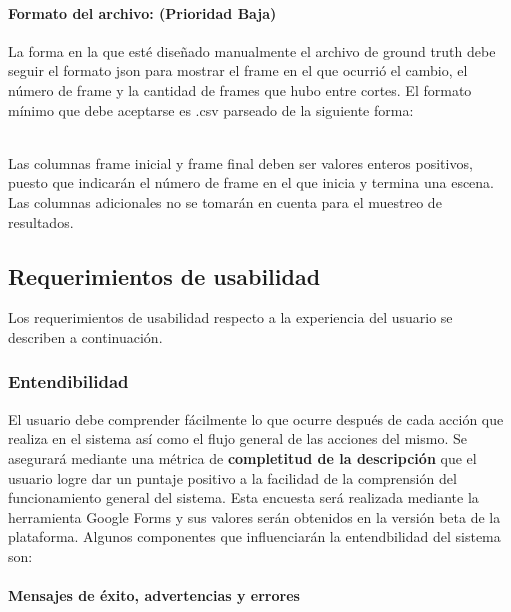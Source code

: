 \documentclass[a4paper]{article}
\newcommand\tab[1][0.55cm]{\hspace*{#1}}
\begin{document}
{        \paragraph{Formato del archivo: (Prioridad Baja)}
     	La forma en la que esté diseñado manualmente el archivo de ground truth debe seguir el formato json para mostrar el frame en el que ocurrió el cambio, el número de frame y la cantidad de frames que hubo entre cortes. El formato mínimo que debe aceptarse es .csv parseado de la siguiente forma: \\
        
 \\

\justify

\tab 		Las columnas frame inicial y frame final deben ser valores enteros positivos, puesto que indicarán el número de frame en el que inicia y termina una escena. Las columnas adicionales no se tomarán en cuenta para el muestreo de resultados. \\


\justify

\color{Blue}
\subsection{Requerimientos de usabilidad}
\color{black}  %
\justify 
	Los requerimientos de usabilidad respecto a la experiencia del usuario se describen a continuación. 

       \subsubsection{Entendibilidad}
    	El usuario debe comprender fácilmente lo que ocurre después de cada acción que realiza en el sistema así como el flujo general de las acciones del mismo. Se asegurará mediante una métrica de \textbf{completitud de la descripción} que el usuario logre dar un puntaje positivo a la facilidad de la comprensión del funcionamiento general del sistema. Esta encuesta será realizada mediante la herramienta Google Forms y sus valores serán obtenidos en la versión beta de la plataforma. Algunos componentes que influenciarán la entendbilidad del sistema son:  
        
          \paragraph{Mensajes de éxito, advertencias y errores} 
          
}
\end{document}
